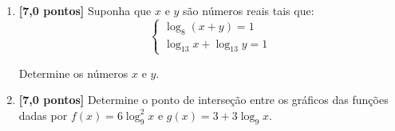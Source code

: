 \documentclass[12pt,a4paper]{article}
\begin{document}
\begin{enumerate}
  \item \textbf{[7,0 pontos]} Suponha que $x$ e $y$ são números reais tais que:
  $$\begin{cases} 
    \log_{8} (x+y) = 1\\
    \log_{13} x + \log_{13} y = 1
  \end{cases}$$
  
  Determine os números $x$ e $y$.

  \item \textbf{[7,0 pontos]} Determine o ponto de interseção entre os gráficos
    das funções dadas por \mbox{$f(x) = 6\log_9^2 x$} e $g(x) = 3 + 3\log_9 x$.
  
\end{enumerate}
\end{document}
